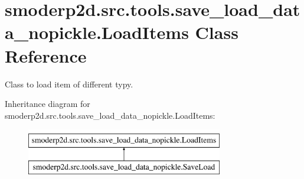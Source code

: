 \hypertarget{classsmoderp2d_1_1src_1_1tools_1_1save__load__data__nopickle_1_1LoadItems}{\section{smoderp2d.\-src.\-tools.\-save\-\_\-load\-\_\-data\-\_\-nopickle.\-Load\-Items Class Reference}
\label{classsmoderp2d_1_1src_1_1tools_1_1save__load__data__nopickle_1_1LoadItems}
}


Class to load item of different typy.  


Inheritance diagram for smoderp2d.\-src.\-tools.\-save\-\_\-load\-\_\-data\-\_\-nopickle.\-Load\-Items\-:\begin{figure}[H]
\begin{center}
\leavevmode
\includegraphics[height=2.000000cm]{d3/d1f/classsmoderp2d_1_1src_1_1tools_1_1save__load__data__nopickle_1_1LoadItems}
\end{center}
\end{figure}
